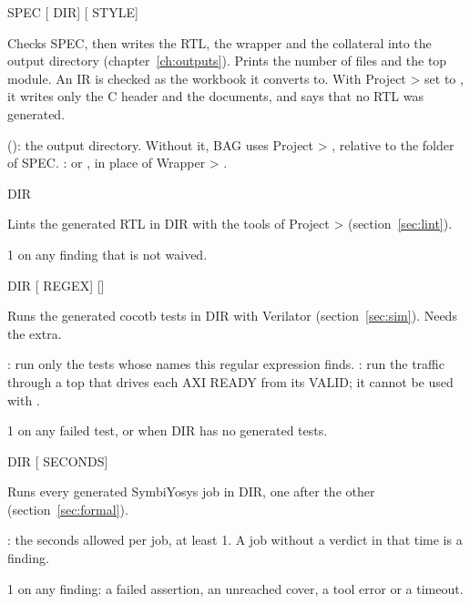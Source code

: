 \begin{entry}{ SPEC [ DIR] [ STYLE]}
\item[Does] Checks SPEC, then writes the RTL, the wrapper and the collateral into the
  output directory (chapter~\ref{ch:outputs}). Prints the number of files and the top
  module. An IR is checked as the workbook it converts to. With Project >
   set to , it writes only the C header and the documents,
  and says that no RTL was generated.
\item[Options]  (): the output directory. Without it, BAG uses
  Project > , relative to the folder of SPEC.
  :  or , in place of Wrapper >
  .
\end{entry}

\begin{entry}{ DIR}
\item[Does] Lints the generated RTL in DIR with the tools of Project >
   (section~\ref{sec:lint}).
\item[Exit status] 1 on any finding that is not waived.
\end{entry}

\begin{entry}{ DIR [ REGEX] []}
\item[Does] Runs the generated cocotb tests in DIR with Verilator
  (section~\ref{sec:sim}). Needs the  extra.
\item[Options] : run only the tests whose names this regular expression
  finds. : run the traffic through a top that drives each AXI READY
  from its VALID; it cannot be used with .
\item[Exit status] 1 on any failed test, or when DIR has no generated tests.
\end{entry}

\begin{entry}{ DIR [ SECONDS]}
\item[Does] Runs every generated SymbiYosys job in DIR, one after the other
  (section~\ref{sec:formal}).
\item[Options] : the seconds allowed per job, at least 1. A job without a
  verdict in that time is a finding.
\item[Exit status] 1 on any finding: a failed assertion, an unreached cover, a tool
  error or a timeout.
\end{entry}

